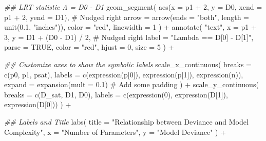 \documentclass[
  letterpaper,
]{scrbook}
\newenvironment{Shaded}{\begin{snugshade}}{\end{snugshade}}
\newcommand{\AttributeTok}[1]{\textcolor[rgb]{0.40,0.45,0.13}{#1}}
\newcommand{\CommentTok}[1]{\textcolor[rgb]{0.37,0.37,0.37}{#1}}
\newcommand{\ConstantTok}[1]{\textcolor[rgb]{0.56,0.35,0.01}{#1}}
\newcommand{\DecValTok}[1]{\textcolor[rgb]{0.68,0.00,0.00}{#1}}
\newcommand{\DocumentationTok}[1]{\textcolor[rgb]{0.37,0.37,0.37}{\textit{#1}}}
\newcommand{\FloatTok}[1]{\textcolor[rgb]{0.68,0.00,0.00}{#1}}
\newcommand{\FunctionTok}[1]{\textcolor[rgb]{0.28,0.35,0.67}{#1}}
\newcommand{\NormalTok}[1]{\textcolor[rgb]{0.00,0.23,0.31}{#1}}
\newcommand{\SpecialCharTok}[1]{\textcolor[rgb]{0.37,0.37,0.37}{#1}}
\newcommand{\StringTok}[1]{\textcolor[rgb]{0.13,0.47,0.30}{#1}}
\begin{document}
\begin{Shaded}
\begin{Highlighting}[]
  \DocumentationTok{\#\# LRT statistic Λ = D0 {-} D1}
  \FunctionTok{geom\_segment}\NormalTok{(}
    \FunctionTok{aes}\NormalTok{(}\AttributeTok{x =}\NormalTok{ p1 }\SpecialCharTok{+} \DecValTok{2}\NormalTok{, }\AttributeTok{y =}\NormalTok{ D0, }\AttributeTok{xend =}\NormalTok{ p1 }\SpecialCharTok{+} \DecValTok{2}\NormalTok{, }\AttributeTok{yend =}\NormalTok{ D1), }\CommentTok{\# Nudged right}
    \AttributeTok{arrow =} \FunctionTok{arrow}\NormalTok{(}\AttributeTok{ends =} \StringTok{"both"}\NormalTok{, }\AttributeTok{length =} \FunctionTok{unit}\NormalTok{(}\FloatTok{0.1}\NormalTok{, }\StringTok{"inches"}\NormalTok{)),}
    \AttributeTok{color =} \StringTok{"red"}\NormalTok{,}
    \AttributeTok{linewidth =} \DecValTok{1}
\NormalTok{  ) }\SpecialCharTok{+}
  \FunctionTok{annotate}\NormalTok{(}
    \StringTok{"text"}\NormalTok{,}
    \AttributeTok{x =}\NormalTok{ p1 }\SpecialCharTok{+} \DecValTok{3}\NormalTok{, }\AttributeTok{y =}\NormalTok{ D1 }\SpecialCharTok{+}\NormalTok{ (D0 }\SpecialCharTok{{-}}\NormalTok{ D1) }\SpecialCharTok{/} \DecValTok{2}\NormalTok{, }\CommentTok{\# Nudged right}
    \AttributeTok{label =} \StringTok{"Lambda == D[0] {-} D[1]"}\NormalTok{,}
    \AttributeTok{parse =} \ConstantTok{TRUE}\NormalTok{,}
    \AttributeTok{color =} \StringTok{"red"}\NormalTok{, }\AttributeTok{hjust =} \DecValTok{0}\NormalTok{, }\AttributeTok{size =} \DecValTok{5}
\NormalTok{  ) }\SpecialCharTok{+}
  
  \DocumentationTok{\#\# Customize axes to show the symbolic labels}
  \FunctionTok{scale\_x\_continuous}\NormalTok{(}
    \AttributeTok{breaks =} \FunctionTok{c}\NormalTok{(p0, p1, psat),}
    \AttributeTok{labels =} \FunctionTok{c}\NormalTok{(}\FunctionTok{expression}\NormalTok{(p[}\DecValTok{0}\NormalTok{]), }\FunctionTok{expression}\NormalTok{(p[}\DecValTok{1}\NormalTok{]), }\FunctionTok{expression}\NormalTok{(n)),}
    \AttributeTok{expand =} \FunctionTok{expansion}\NormalTok{(}\AttributeTok{mult =} \FloatTok{0.1}\NormalTok{) }\CommentTok{\# Add some padding}
\NormalTok{  ) }\SpecialCharTok{+}
  \FunctionTok{scale\_y\_continuous}\NormalTok{(}
    \AttributeTok{breaks =} \FunctionTok{c}\NormalTok{(D\_sat, D1, D0),}
    \AttributeTok{labels =} \FunctionTok{c}\NormalTok{(}\FunctionTok{expression}\NormalTok{(}\DecValTok{0}\NormalTok{), }\FunctionTok{expression}\NormalTok{(D[}\DecValTok{1}\NormalTok{]), }\FunctionTok{expression}\NormalTok{(D[}\DecValTok{0}\NormalTok{]))}
\NormalTok{  ) }\SpecialCharTok{+}
  
  \DocumentationTok{\#\# Labels and Title}
  \FunctionTok{labs}\NormalTok{(}
    \AttributeTok{title =} \StringTok{"Relationship between Deviance and Model Complexity"}\NormalTok{,}
    \AttributeTok{x =} \StringTok{"Number of Parameters"}\NormalTok{,}
    \AttributeTok{y =} \StringTok{"Model Deviance"}
\NormalTok{  ) }\SpecialCharTok{+}
  

\end{Highlighting}
\end{Shaded}
\end{document}

